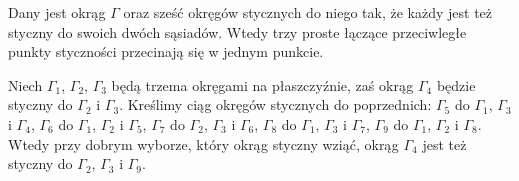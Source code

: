 \begin{proposition}
	Dany jest okrąg $\Gamma$ oraz sześć okręgów stycznych do niego tak, że każdy jest też styczny do swoich dwóch sąsiadów.
	Wtedy trzy proste łączące przeciwległe punkty styczności przecinają się w jednym punkcie.
\end{proposition}

\begin{proposition}
	Niech $\Gamma_1$, $\Gamma_2$, $\Gamma_3$ będą trzema okręgami na płaszczyźnie, zaś okrąg $\Gamma_4$ będzie styczny do $\Gamma_2$ i $\Gamma_3$.
	Kreślimy ciąg okręgów stycznych do poprzednich:
	$\Gamma_5$ do $\Gamma_1$, $\Gamma_3$ i $\Gamma_4$,
	$\Gamma_6$ do $\Gamma_1$, $\Gamma_2$ i $\Gamma_5$,
	$\Gamma_7$ do $\Gamma_2$, $\Gamma_3$ i $\Gamma_6$,
	$\Gamma_8$ do $\Gamma_1$, $\Gamma_3$ i $\Gamma_7$,
	$\Gamma_9$ do $\Gamma_1$, $\Gamma_2$ i $\Gamma_8$.
	Wtedy przy dobrym wyborze, który okrąg styczny wziąć, okrąg $\Gamma_4$ jest też styczny do $\Gamma_2$, $\Gamma_3$ i $\Gamma_9$.
\end{proposition}
